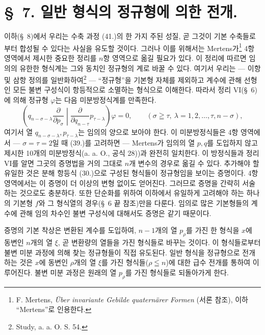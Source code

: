 \section*{\S\ 7. 일반 형식의 정규형에 의한 전개.}
이하(\S\ 8)에서 우리는 수축 과정 (41.)의 한 가지 주된 성질, 곧 그것이 기본 수축들로부터 합성될 수 있다는 사실을 유도할 것이다. 그러나 이를 위해서는 Mertens가\footnote{F. Mertens, \emph{\"Uber invariante Gebilde quatern\"arer Formen} (서론 참조), 이하 “Mertens”로 인용한다.} 4항 영역에서 제시한 중요한 정리를 $n$항 영역으로 옮길 필요가 있다. 이 정리에 따르면 임의의 유한한 형식계는 그와 동치인 정규형의 계로 바꿀 수 있다. 여기서 우리는 --- 이항 및 삼항 정의를 일반화하여\footnote{Study, a. a. O. S. 54.} --- “정규형”을 기본형 자체를 제외하고 계수에 관해 선형인 모든 불변 구성식이 항등적으로 소멸하는 형식으로 이해한다. 따라서 정리 VI(\S\ 6)에 의해 정규형 $\varphi$는 다음 미분방정식계를 만족한다.
\begin{equation}
 \left(q_{n-\sigma-\lambda}\frac{\partial}{\partial p_\sigma}\middle|\frac{\partial}{\partial q_{n-\tau}}p_{\tau-\lambda}\right)\varphi=0,
 \qquad(\sigma\geqq\tau,\ \lambda=1,2,\ldots,\tau,n-\sigma),
\tag{46}
\end{equation}
여기서 열 $q_{n-\sigma-\lambda},p_{\tau-\lambda}$는 임의의 양으로 보아야 한다. 이 미분방정식들은 4항 영역에서 --- $\sigma=\tau=2$일 때 (39.)를 고려하면 --- Mertens가 임의의 열 $p,q$를 도입하지 않고 제시한 10개의 미분방정식(a. a. O., 공식 28))과 완전히 일치한다. 이 방정식들과 정리 VI를 알면 그곳의 증명법을 거의 그대로 $n$개 변수의 경우로 옮길 수 있다. 추가해야 할 유일한 것은 분해 항등식 (30.)으로 구성된 형식들이 정규형임을 보이는 증명이다. 4항 영역에서는 이 증명이 더 이상의 변형 없이도 얻어진다. 그러므로 증명을 간략히 서술하는 것으로도 충분하다. 또한 단순화를 위하여 이하에서 유일하게 고려해야 하는 하나의 기본형 $f$와 그 형식열의 경우(\S\ 6 끝 참조)만을 다룬다. 임의로 많은 기본형들의 계수에 관해 임의 차수인 불변 구성식에 대해서도 증명은 같기 때문이다.

증명의 기본 착상은 변환된 계수를 도입하여, $n-1$개의 열 $p_\rho$를 가진 한 형식을 $x$에 동변인 $n$개의 열 $\xi$, 곧 변환량의 열들을 가진 형식들로 바꾸는 것이다. 이 형식들로부터 불변 미분 과정에 의해 찾는 정규형들이 직접 유도된다. 일반 형식을 정규형으로 전개하는 것은 $x$에 동변인 $\rho$개의 열 $\xi$를 가진 형식들($\rho\leqq n$)에 대한 급수 전개를 통하여 이루어진다. 불변 미분 과정은 원래의 열 $p_\rho$를 가진 형식들로 되돌아가게 한다.

